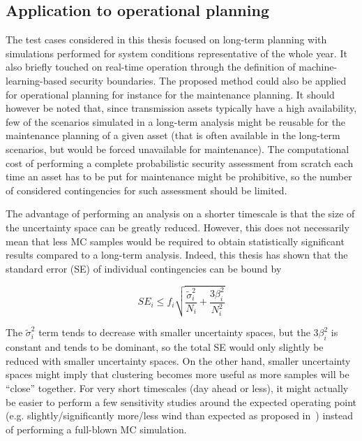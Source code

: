 
\subsection*{Application to operational planning}

The test cases considered in this thesis focused on long-term planning with simulations performed for system conditions representative of the whole year. It also briefly touched on real-time operation through the definition of machine-learning-based security boundaries. The proposed method could also be applied for operational planning for instance for the maintenance planning. It should however be noted that, since transmission assets typically have a high availability, few of the scenarios simulated in a long-term analysis might be reusable for the maintenance planning of a given asset (that is often available in the long-term scenarios, but would be forced unavailable for maintenance). The computational cost of performing a complete probabilistic security assessment from scratch each time an asset has to be put for maintenance might be prohibitive, so the number of considered contingencies for such assessment should be limited.

The advantage of performing an analysis on a shorter timescale is that the size of the uncertainty space can be greatly reduced. However, this does not necessarily mean that less MC samples would be required to obtain statistically significant results compared to a long-term analysis. Indeed, this thesis has shown that the standard error (SE) of individual contingencies can be bound by

\begin{equation}
\label{eq:SE_bound_repeated}
SE_i \leq f_i \sqrt{\frac{\tilde{\sigma}_i^2}{N_i} + \frac{3 \beta_i^2}{N_i^2}}
\end{equation}

The \(\tilde{\sigma}_i^2\) term tends to decrease with smaller uncertainty spaces, but the \(3 \beta_i^2\) is constant and tends to be dominant, so the total SE would only slightly be reduced with smaller uncertainty spaces. On the other hand, smaller uncertainty spaces might imply that clustering becomes more useful as more samples will be ``close'' together. For very short timescales (day ahead or less), it might actually be easier to perform a few sensitivity studies around the expected operating point (e.g. slightly/significantly more/less wind than expected as proposed in~\cite{Gamze_DIFERS}) instead of performing a full-blown MC simulation.



